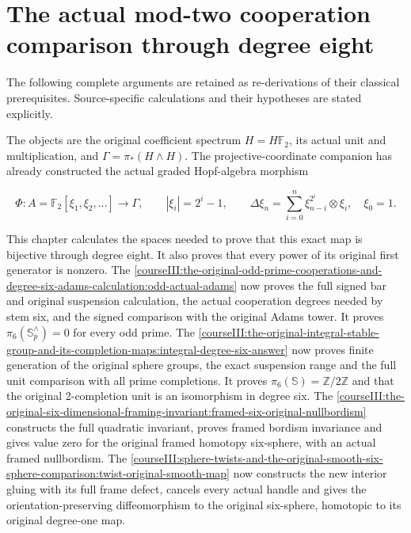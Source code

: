 \section{The actual mod-two cooperation comparison through degree eight}\label{courseIII:the-actual-mod-two-cooperation-comparison-through-degree-eight:section}

The following complete arguments are retained as re-derivations of their classical prerequisites. Source-specific calculations and their hypotheses are stated explicitly.

The objects are the original coefficient spectrum \(H=H\mathbb F_2\), its actual unit and multiplication, and \(\Gamma=\pi_*(H\wedge H)\). The projective-coordinate companion has already constructed the actual graded Hopf-algebra morphism

\begin{equation}
\Phi:A=\mathbb F_2[\xi_1,\xi_2,\ldots]\longrightarrow\Gamma,
\qquad |\xi_i|=2^i-1,
\qquad \Delta\xi_n=\sum_{i=0}^n\xi_{n-i}^{2^i}\otimes\xi_i,
\quad \xi_0=1.
\label{courseIII:the-actual-mod-two-cooperation-comparison-through-degree-eight:eq:0.1}
\end{equation}

This chapter calculates the spaces needed to prove that this exact map is bijective through degree eight. It also proves that every power of its original first generator is nonzero. The \cref{courseIII:the-original-odd-prime-cooperations-and-degree-six-adams-calculation:odd-actual-adams} now proves the full signed bar and original suspension calculation, the actual cooperation degrees needed by stem six, and the signed comparison with the original Adams tower. It proves \(\pi_6(\mathbb S^{\wedge}_p)=0\) for every odd prime. The \cref{courseIII:the-original-integral-stable-group-and-its-completion-maps:integral-degree-six-answer} now proves finite generation of the original sphere groups, the exact suspension range and the full unit comparison with all prime completions. It proves \(\pi_6(\mathbb S)=\mathbb Z/2\mathbb Z\) and that the original 2-completion unit is an isomorphism in degree six. The \cref{courseIII:the-original-six-dimensional-framing-invariant:framed-six-original-nullbordism} constructs the full quadratic invariant, proves framed bordism invariance and gives value zero for the original framed homotopy six-sphere, with an actual framed nullbordism. The \cref{courseIII:sphere-twists-and-the-original-smooth-six-sphere-comparison:twist-original-smooth-map} now constructs the new interior gluing with its full frame defect, cancels every actual handle and gives the orientation-preserving diffeomorphism to the original six-sphere, homotopic to its original degree-one map.

